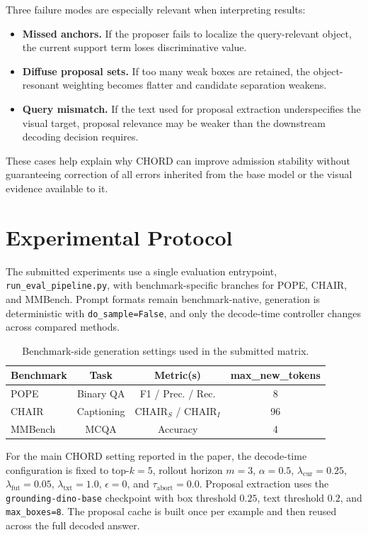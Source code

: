 \documentclass[sigconf,anonymous,nonacm]{acmart}
\begin{document}
Three failure modes are especially relevant when interpreting results:
\begin{itemize}
    \item \textbf{Missed anchors.} If the proposer fails to localize the query-relevant object, the current support term loses discriminative value.
    \item \textbf{Diffuse proposal sets.} If too many weak boxes are retained, the object-resonant weighting becomes flatter and candidate separation weakens.
    \item \textbf{Query mismatch.} If the text used for proposal extraction underspecifies the visual target, proposal relevance may be weaker than the downstream decoding decision requires.
\end{itemize}

These cases help explain why CHORD can improve admission stability without guaranteeing correction of all errors inherited from the base model or the visual evidence available to it.

\section{Experimental Protocol}
\label{sec:supp_protocol}

The submitted experiments use a single evaluation entrypoint, \texttt{run\_eval\_pipeline.py}, with benchmark-specific branches for POPE, CHAIR, and MMBench. Prompt formats remain benchmark-native, generation is deterministic with \texttt{do\_sample=False}, and only the decode-time controller changes across compared methods.

\begin{table}[t]
\centering
\scriptsize
\setlength{\tabcolsep}{3pt}
\caption{Benchmark-side generation settings used in the submitted matrix.}
\label{tab:supp_protocol}
\begin{tabular}{lccc}
\toprule
\textbf{Benchmark} & \textbf{Task} & \textbf{Metric(s)} & \textbf{max\_new\_tokens} \\
\midrule
POPE    & Binary QA  & F1 / Prec. / Rec. & 8 \\
CHAIR   & Captioning & CHAIR$_S$ / CHAIR$_I$ & 96 \\
MMBench & MCQA       & Accuracy & 4 \\
\bottomrule
\end{tabular}
\end{table}

For the main CHORD setting reported in the paper, the decode-time configuration is fixed to top-$k=5$, rollout horizon $m=3$, $\alpha=0.5$, $\lambda_{\mathrm{cur}}=0.25$, $\lambda_{\mathrm{fut}}=0.05$, $\lambda_{\mathrm{txt}}=1.0$, $\epsilon=0$, and $\tau_{\mathrm{abort}}=0.0$. Proposal extraction uses the \texttt{grounding-dino-base} checkpoint with box threshold $0.25$, text threshold $0.2$, and \texttt{max\_boxes=8}. The proposal cache is built once per example and then reused across the full decoded answer.
\end{document}
